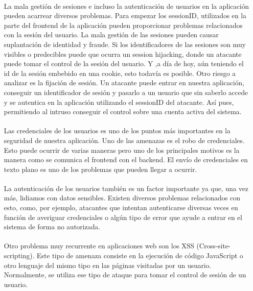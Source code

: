 \paragraph{}
La mala gestión de sesiones e incluso la autenticación de usuarios en la aplicación pueden acarrear diversos problemas. Para empezar los sessionID, utilizados en la parte del frontend de la aplicación pueden proporcionar problemas relacionados con la sesión del usuario. La mala gestión de las sesiones pueden causar suplantación de identidad y fraude. Si los identificadores de las sesiones son muy visibles o predecibles puede que ocurra un session hijacking, donde un atacante puede tomar el control de la sesión del usuario. Y ,a día de hoy, aún teniendo el id de la sesión embebido en una cookie, esto todavía es posible. Otro riesgo a analizar es la fijación de sesión. Un atacante puede entrar en nuestra aplicación, conseguir un identificador de sesión y pasarlo a un usuario que sin saberlo accede y se autentica en la aplicación utilizando el sessionID del atacante. Así pues, permitiendo al intruso conseguir el control sobre una cuenta activa del sistema.
\paragraph{}
Las credenciales de los usuarios es uno de los puntos más importantes en la seguridad de nuestra aplicación. Uno de las amenazas es el robo de credenciales. Esto puede ocurrir de varias maneras pero uno de los principales motivos es la manera como se comunica el frontend con el backend. El envío de credenciales en texto plano es uno de los problemas que pueden llegar a ocurrir. 
\paragraph{}
La autenticación de los usuarios también es un factor importante ya que, una vez más, lidiamos con datos sensibles. Existen diversos problemas relacionados con esto, como, por ejemplo, atacantes que intentan autenticarse diversas veces en función de averiguar credenciales o algún tipo de error que ayude a entrar en el sistema de forma no autorizada.
\paragraph{}
Otro problema muy recurrente en aplicaciones web son los XSS (Cross-site-scripting). Este tipo de amenaza consiste en la ejecución de código JavaScript o otro lenguaje del mismo tipo en las páginas visitadas por un usuario. Normalmente, se utiliza ese tipo de ataque para 
tomar el control de sesión de un usuario.
